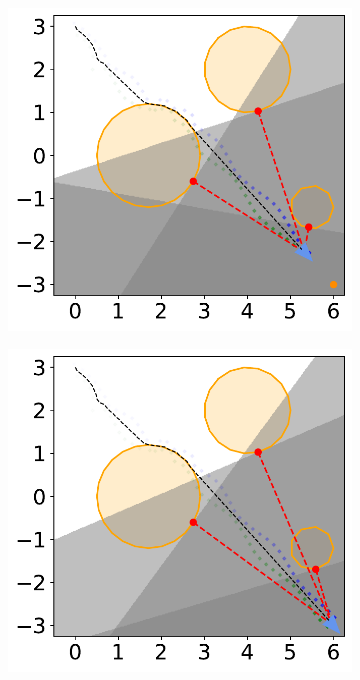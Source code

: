 \begin{figure}[H]
    \begin{subfigure}{0.35\textwidth}
        \centering
        \includegraphics[width=\textwidth]{figures/Simulations/sim1circles/frame_8.pdf}
    \end{subfigure}%
    \hfil
    \begin{subfigure}{0.35\textwidth}
        \centering
        \includegraphics[width=\textwidth]{figures/Simulations/sim1circles/frame_9.pdf}

\end{subfigure}
\end{figure}

